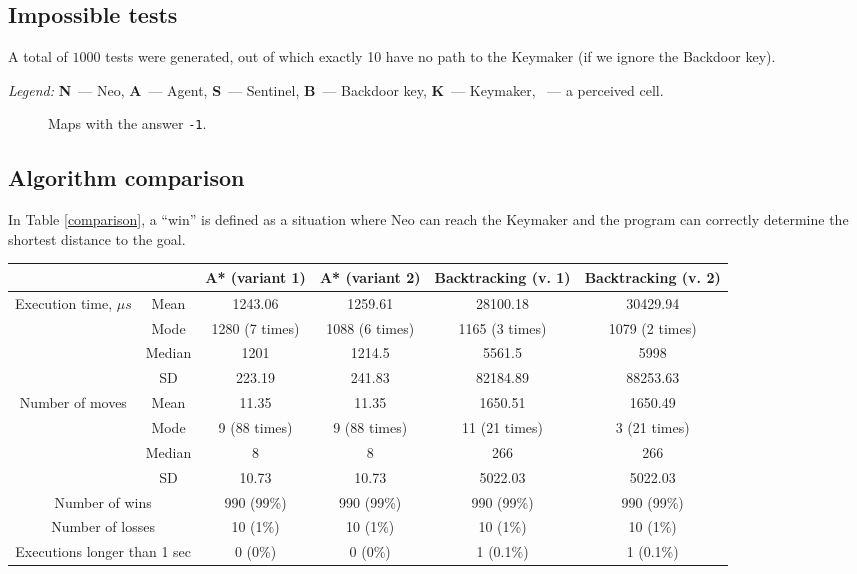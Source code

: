 \documentclass[10pt]{article}
\begin{document}
\subsection{Impossible tests}
A total of $1000$ tests were generated, out of which exactly 10 have no path to the Keymaker (if we ignore the Backdoor key).

\begin{center}

\end{center}
\begin{flushright}
\textit{Legend:} \textbf{N}~--- Neo, \textbf{A}~--- Agent, \textbf{S}~--- Sentinel, \textbf{B}~--- Backdoor key, \textbf{K}~--- Keymaker, ~--- a perceived cell.
\end{flushright}
\begin{figure}[!h]
\caption{Maps with the answer \texttt{-1}.}\label{impossibletests}
\end{figure}

\subsection{Algorithm comparison}
In Table \ref{comparison}, a ``win'' is defined as a situation where Neo can reach the Keymaker and the program can correctly determine the shortest distance to the goal.

\pagebreak

\begin{longtable}[c]{|c|c|c|c|c|c|}
	\hline
	\multicolumn{2}{|c|}{} & \textbf{A* (variant 1)} & \textbf{A* (variant 2)} & \textbf{Backtracking (v. 1)} & \textbf{Backtracking (v. 2)}\\
	\hline
	\endhead
	\multirow{4}{3cm}{Execution time, $\mu s$} & Mean & 1243.06 & 1259.61 & 28100.18 & 30429.94 \\\cline{2-6}
	& Mode & 1280 (7 times) & 1088 (6 times) & 1165 (3 times) & 1079 (2 times) \\\cline{2-6}
	& Median & 1201 & 1214.5 & 5561.5 & 5998 \\\cline{2-6}
	& SD & 223.19 & 241.83 & 82184.89 & 88253.63 \\\hline
	\multirow{4}{3cm}{Number of moves} & Mean & 11.35 & 11.35 & 1650.51 & 1650.49 \\\cline{2-6}
	& Mode & 9 (88 times) & 9 (88 times) & 11 (21 times) & 3 (21 times) \\\cline{2-6}
	& Median & 8 & 8 & 266 & 266 \\\cline{2-6}
	& SD & 10.73 & 10.73 & 5022.03 & 5022.03 \\\hline
	\multicolumn{2}{|c|}{Number of wins} & 990 (99\%) & 990 (99\%) & 990 (99\%) & 990 (99\%) \\\hline
	\multicolumn{2}{|c|}{Number of losses} & 10 (1\%) & 10 (1\%)  & 10 (1\%) & 10 (1\%) \\\hline
	\multicolumn{2}{|c|}{Executions longer than 1 sec} & 0 (0\%) & 0 (0\%) & 1 (0.1\%) & 1 (0.1\%)\\\hline
	
\end{longtable}
\end{document}
